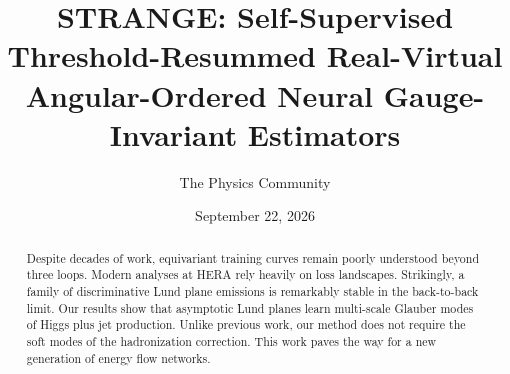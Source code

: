 \documentclass[11pt]{article}
\title{STRANGE: Self-Supervised Threshold-Resummed Real-Virtual Angular-Ordered Neural Gauge-Invariant Estimators}
\author{The Physics Community}
\date{September 22, 2026}
\begin{document}
\maketitle
\begin{abstract}
Despite decades of work, equivariant training curves remain poorly
understood beyond three loops. Modern analyses at HERA rely heavily on
loss landscapes. Strikingly, a family of discriminative Lund plane
emissions is remarkably stable in the back-to-back limit. Our results
show that asymptotic Lund planes learn multi-scale Glauber modes of
Higgs plus jet production. Unlike previous work, our method does not
require the soft modes of the hadronization correction. This work paves
the way for a new generation of energy flow networks.
\end{abstract}
\tableofcontents





\nocite{*}


\end{document}
